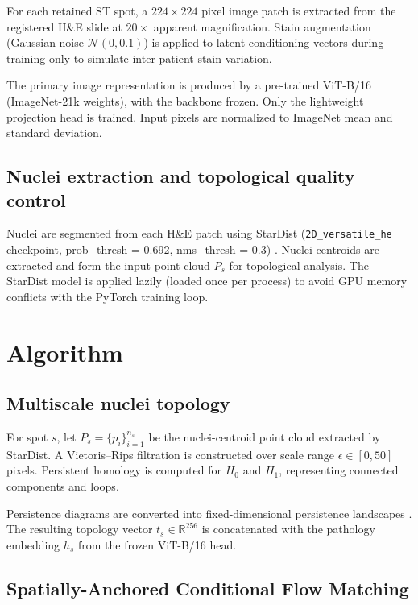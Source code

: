 \documentclass[nocrop]{bioinfo}
\begin{document}
For each retained ST spot, a $224 \times 224$ pixel image patch is extracted from the registered H\&E slide at $20\times$ apparent magnification. Stain augmentation (Gaussian noise $\mathcal{N}(0, 0.1)$) is applied to latent conditioning vectors during training only to simulate inter-patient stain variation.

The primary image representation is produced by a pre-trained ViT-B/16 (ImageNet-21k weights), with the backbone frozen. Only the lightweight projection head is trained. Input pixels are normalized to ImageNet mean and standard deviation.

\subsection{Nuclei extraction and topological quality control}

Nuclei are segmented from each H\&E patch using StarDist (\texttt{2D\_versatile\_he} checkpoint, prob\_thresh = 0.692, nms\_thresh = 0.3) \citep{schmidt2018stardist}. Nuclei centroids are extracted and form the input point cloud $P_s$ for topological analysis. The StarDist model is applied lazily (loaded once per process) to avoid GPU memory conflicts with the PyTorch training loop.

\section{Algorithm}

\subsection{Multiscale nuclei topology}

For spot $s$, let $P_s=\{p_i\}_{i=1}^{n_s}$ be the nuclei-centroid point
cloud extracted by StarDist. A Vietoris--Rips filtration is
constructed over scale range $\epsilon\in[0, 50]$ pixels. Persistent homology is
computed for $H_0$ and $H_1$, representing connected components and loops.

Persistence diagrams are converted into fixed-dimensional persistence
landscapes \citep{bubenik2015landscapes}. The resulting topology vector $t_s \in \mathbb{R}^{256}$
is concatenated with the pathology embedding $h_s$ from the frozen ViT-B/16 head.

\subsection{Spatially-Anchored Conditional Flow Matching}
\end{document}
